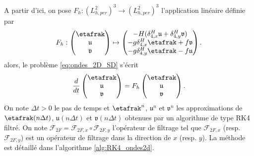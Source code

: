 A partir d'ici, on pose $F_h : (L_{h,per}^2)^3 \rightarrow (L_{h,per}^2)^3$ l'application linéaire définie par
\begin{equation}
F_h : \begin{pmatrix}
\etafrak \\ \mathfrak{u} \\ \mathfrak{v}
\end{pmatrix} \mapsto \begin{pmatrix}
- H (\delta_{4,x}^H \mathfrak{u} + \delta_{4,y}^H \mathfrak{v}) \\
- g \delta_{4,x}^H \etafrak + f \mathfrak{v} \\
- g \delta_{4,y}^H \etafrak - f \mathfrak{u}
\end{pmatrix}.
\end{equation}
alors, le problème \eqref{eq:ondes_2D_SD} s'écrit
\begin{equation}
\dfrac{d}{dt} \begin{pmatrix}
\etafrak \\ \mathfrak{u} \\ \mathfrak{v}
\end{pmatrix} = F_h\begin{pmatrix}
\etafrak \\ \mathfrak{u} \\ \mathfrak{v}
\end{pmatrix}.
\end{equation}
On note $\Delta t>0$ le pas de temps et $\etafrak^n$, $\mathfrak{u}^n$ et $\mathfrak{v}^n$ les approximations de $\etafrak(n\Delta t)$, $\mathfrak{u}(n \Delta t)$ et $\mathfrak{v}(n \Delta t)$ obtenues par un algorithme de type RK4 filtré. On note $\mathcal{F}_{2F} = \mathcal{F}_{2F,x} \circ \mathcal{F}_{2F,y}$ l'opérateur de filtrage tel que $\mathcal{F}_{2F,x}$ (resp. $\mathcal{F}_{2F,y}$) est un opérateur de filtrage dans la direction de $x$ (resp. $y$). La méthode est détaillé dans l'algorithme \ref{alg:RK4_ondes2d}.

